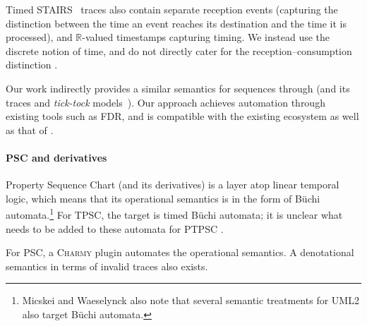Timed
STAIRS~\cite{Haugen05-TimedSTAIRS} traces also contain separate reception
events (capturing the distinction between the time an event reaches
its destination and the time it is processed), and \(\mathbb R\)-valued
timestamps capturing timing.  We instead use the discrete \tockcsp{} notion
of time, and do not directly cater for the reception--consumption distinction
.

Our work indirectly provides a similar semantics for \langname{}
sequences through \tockcsp{} (and its traces and \emph{tick-tock} models~\cite{Baxter21-TickTock}).
Our approach achieves automation through existing tools such as FDR,
and is compatible with the existing \robostar{} ecosystem as well as that of
\tockcsp.

\paragraph{PSC and derivatives}

Property Sequence Chart (and its derivatives) is a layer atop
linear temporal logic, which means that its operational semantics is
in the form of B\"uchi automata.\footnote{
Micskei and Waeselynck also note that several semantic treatments for UML2 also
target B\"uchi automata.}
For TPSC, the target is timed B\"uchi
automata; it is unclear what needs to be added to these automata for PTPSC .


For PSC, a \textsc{Charmy} plugin automates the operational semantics.  A denotational semantics in terms of
invalid traces also exists.